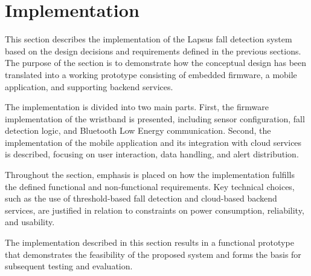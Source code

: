 \section{Implementation}
This section describes the implementation of the Lapsus fall detection system based on the design decisions and requirements defined in the previous sections. The purpose of the section is to demonstrate how the conceptual design has been translated into a working prototype consisting of embedded firmware, a mobile application, and supporting backend services.

The implementation is divided into two main parts. First, the firmware implementation of the wristband is presented, including sensor configuration, fall detection logic, and Bluetooth Low Energy communication. Second, the implementation of the mobile application and its integration with cloud services is described, focusing on user interaction, data handling, and alert distribution.

Throughout the section, emphasis is placed on how the implementation fulfills the defined functional and non-functional requirements. Key technical choices, such as the use of threshold-based fall detection and cloud-based backend services, are justified in relation to constraints on power consumption, reliability, and usability.

The implementation described in this section results in a functional prototype that demonstrates the feasibility of the proposed system and forms the basis for subsequent testing and evaluation.


